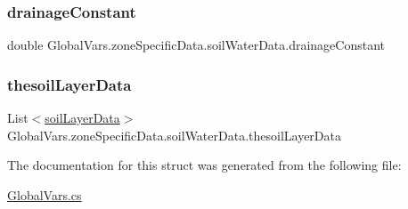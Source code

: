 \subsubsection{\texorpdfstring{drainageConstant}{drainageConstant}}
{\footnotesize\ttfamily double Global\+Vars.\+zone\+Specific\+Data.\+soil\+Water\+Data.\+drainage\+Constant}

\mbox{\label{struct_global_vars_1_1zone_specific_data_1_1soil_water_data_a0dd1174e86427d3c82c8c23021b55edf}} 
\subsubsection{\texorpdfstring{thesoilLayerData}{thesoilLayerData}}
{\footnotesize\ttfamily List$<$\mbox{\hyperlink{struct_global_vars_1_1zone_specific_data_1_1soil_layer_data}{soil\+Layer\+Data}}$>$ Global\+Vars.\+zone\+Specific\+Data.\+soil\+Water\+Data.\+thesoil\+Layer\+Data}



The documentation for this struct was generated from the following file\+:\begin{DoxyCompactItemize}
\item 
\mbox{\hyperlink{_global_vars_8cs}{Global\+Vars.\+cs}}\end{DoxyCompactItemize}
